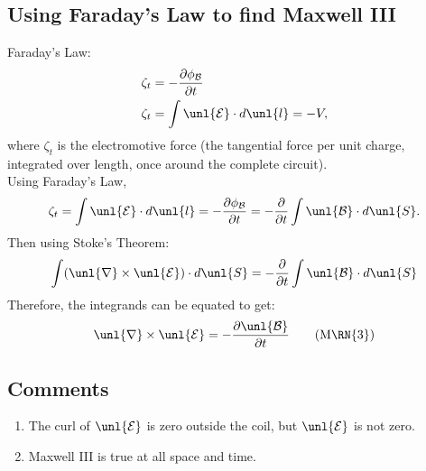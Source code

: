 \documentclass[a4paper, 11pt, normalem]{report}
\newcommand\p{\partial}
\newcommand\E{\mathcal{E}}
\newcommand\uE{\unl{\E}}
\newcommand\B{\mathcal{B}}
\newcommand\uB{\unl{\B}}
\newcommand\del{\unl{\nabla}}
\begin{document}
\subsection{Using Faraday's Law to find Maxwell \RN{3}}
Faraday's Law:
\begin{align*}
    \zeta_t &= -\frac{\p \phi_\B}{\p t} \\
    \zeta_t &= \int \uE \cdot d\unl{l} = -V,
\end{align*}
where $\zeta_t$ is the electromotive force (the tangential force per unit charge, integrated over length, once around the complete circuit). \\
Using Faraday's Law,
\begin{equation*}
    \zeta_t = \int \uE\cdot d\unl{l} = -\frac{\p \phi_\B}{\p t} = -\frac{\p}{\p t}\int \uB \cdot d\unl{S}.
\end{equation*}
Then using Stoke's Theorem:
\begin{equation*}
    \int (\del \times \uE) \cdot d\unl{S} = -\frac{\p}{\p t}\int \uB \cdot d\unl{S}
\end{equation*}
Therefore, the integrands can be equated to get:
\begin{equation}
    \del \times \uE = -\frac{\p \uB}{\p t} \tag{M\RN{3}}
\end{equation}

\subsection{Comments}
\begin{enumerate}
    \item The curl of $\uE$ is zero outside the coil, but $\uE$ is not zero.
    \item Maxwell \RN{3} is true at all space and time.
\end{enumerate}
\end{document}
